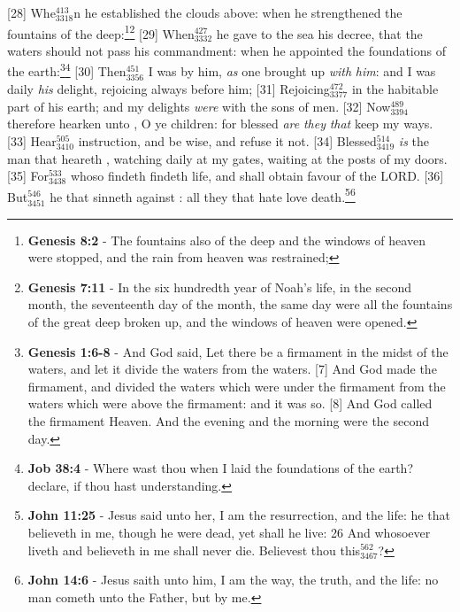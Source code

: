 [28] \textcolor[cmyk]{0.99998,1,0,0}{Whe\textcolor{jungle}{$_{3318}^{413}$}n he established the clouds above: when he strengthened the fountains of the deep:}\footnote{\textbf{Genesis 8:2} - The fountains also of the deep and the windows of heaven were stopped, and the rain from heaven was restrained;}\footnote{\textbf{Genesis 7:11} - In the six hundredth year of Noah’s life, in the second month, the seventeenth day of the month, the same day were all the fountains of the great deep broken up, and the windows of heaven were opened.}
[29] \textcolor[cmyk]{0.99998,1,0,0}{When\textcolor{jungle}{$_{3332}^{427}$} he gave to the sea his decree, that the waters should not pass his commandment: when he appointed the foundations of the earth:}\footnote{\textbf{Genesis 1:6-8} - And God said, Let there be a firmament in the midst of the waters, and let it divide the waters from the waters. [7] And God made the firmament, and divided the waters which were under the firmament from the waters which were above the firmament: and it was so. [8] And God called the firmament Heaven. And the evening and the morning were the second day. }\footnote{\textbf{Job 38:4} - Where wast thou when I laid the foundations of the earth? declare, if thou hast understanding.}
[30] \textcolor[cmyk]{0.99998,1,0,0}{Then\textcolor{jungle}{$_{3356}^{451}$} I was by him, \emph{as} one brought up \emph{with} \emph{him}: and I was daily \emph{his} delight, rejoicing always before him;}
[31] \textcolor[cmyk]{0.99998,1,0,0}{Rejoicing\textcolor{jungle}{$_{3377}^{472}$} in the habitable part of his earth; and my delights \emph{were} with the sons of men.}
[32] \textcolor[cmyk]{0.99998,1,0,0}{Now\textcolor{jungle}{$_{3394}^{489}$} therefore hearken unto , O ye children: for blessed \emph{are} \emph{they} \emph{that} keep my ways.}
[33] \textcolor[cmyk]{0.99998,1,0,0}{Hear\textcolor{jungle}{$_{3410}^{505}$} instruction, and be wise, and refuse it not.}
[34] \textcolor[cmyk]{0.99998,1,0,0}{Blessed\textcolor{jungle}{$_{3419}^{514}$} \emph{is} the man that heareth , watching daily at my gates, waiting at the posts of my doors.}
[35] \textcolor[cmyk]{0.99998,1,0,0}{For\textcolor{jungle}{$_{3438}^{533}$} whoso findeth  findeth life, and shall obtain favour of the LORD.}
[36] \textcolor[cmyk]{0.99998,1,0,0}{But\textcolor{jungle}{$_{3451}^{546}$} he that sinneth against  : all they that hate  love death.}\footnote{\textbf{John 11:25} -  Jesus said unto her, \textcolor[cmyk]{0,0.85,0.70,0.23}{I am the resurrection, and the life: he that believeth in me, though he were dead, yet shall he live: 26 And whosoever liveth and believeth in me shall never die. Believest thou this\textcolor{jungle}{$_{3467}^{562}$}?}}\footnote{\textbf{John 14:6} - Jesus saith unto him, \textcolor[cmyk]{0,0.85,0.70,0.23}{I am the way, the truth, and the life: no man cometh unto the Father, but by me.}}




